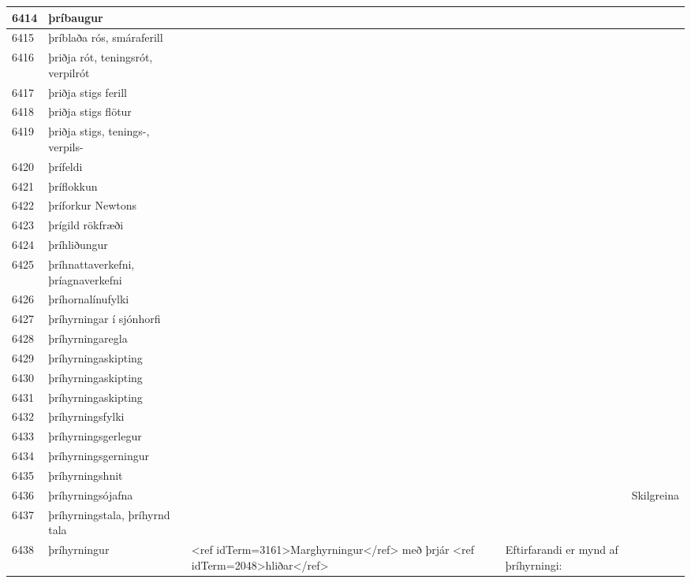 \begin{longtable}{p{}|p{}|p{}|p{}|p{}}
\hline
6414 & þríbaugur &  &  &  \\
\hline
6415 & þríblaða rós, smáraferill &  &  &  \\
\hline
6416 & þriðja rót, teningsrót, verpilrót &  &  &  \\
\hline
6417 & þriðja stigs ferill &  &  &  \\
\hline
6418 & þriðja stigs flötur &  &  &  \\
\hline
6419 & þriðja stigs, tenings-, verpils- &  &  &  \\
\hline
6420 & þrífeldi &  &  &  \\
\hline
6421 & þríflokkun &  &  &  \\
\hline
6422 & þríforkur Newtons &  &  &  \\
\hline
6423 & þrígild rökfræði &  &  &  \\
\hline
6424 & þríhliðungur &  &  &  \\
\hline
6425 & þríhnattaverkefni, þríagnaverkefni &  &  &  \\
\hline
6426 & þríhornalínufylki &  &  &  \\
\hline
6427 & þríhyrningar í sjónhorfi &  &  &  \\
\hline
6428 & þríhyrningaregla &  &  &  \\
\hline
6429 & þríhyrningaskipting &  &  &  \\
\hline
6430 & þríhyrningaskipting &  &  &  \\
\hline
6431 & þríhyrningaskipting &  &  &  \\
\hline
6432 & þríhyrningsfylki &  &  &  \\
\hline
6433 & þríhyrningsgerlegur &  &  &  \\
\hline
6434 & þríhyrningsgerningur &  &  &  \\
\hline
6435 & þríhyrningshnit &  &  &  \\
\hline
6436 & þríhyrningsójafna &  &  & Skilgreina \\
\hline
6437 & þríhyrningstala, þríhyrnd tala &  &  &  \\
\hline
6438 & þríhyrningur & <ref idTerm=3161>Marghyrningur</ref> með þrjár <ref idTerm=2048>hliðar</ref> & Eftirfarandi er mynd af þríhyrningi:


\end{longtable}
